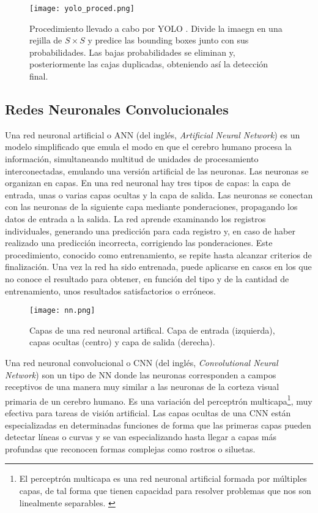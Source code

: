 \begin{figure}[H]
	\begin{center} 
		\texttt{[image: yolo\_proced.png]}
	\end{center}
	\caption{Procedimiento llevado a cabo por YOLO \cite{yolo}. Divide la imaegn en una rejilla de $S \times S$ y predice las bounding boxes junto con sus probabilidades. Las bajas probabilidades se eliminan y, posteriormente las cajas duplicadas, obteniendo así la detección final.}
	\label{fig:proced}
\end{figure}


\subsection{Redes Neuronales Convolucionales}

Una red neuronal artificial o ANN (del inglés, \textit{Artificial Neural Network}) es un modelo simplificado que emula el modo en que el cerebro humano procesa la información, simultaneando multitud de unidades de procesamiento interconectadas, emulando una versión artificial de las neuronas. Las neuronas se organizan en capas. En una red neuronal hay tres tipos de capas: la capa de entrada, unas o varias capas ocultas y la capa de salida. Las neuronas se conectan con las neuronas de la siguiente capa mediante ponderaciones, propagando los datos de entrada a la salida. La red aprende examinando los registros individuales, generando una predicción para cada registro y, en caso de haber realizado una predicción incorrecta, corrigiendo las ponderaciones. Este procedimiento, conocido como entrenamiento, se repite hasta alcanzar criterios de finalización.  Una vez la red ha sido entrenada, puede aplicarse en casos en los que no conoce el resultado para obtener, en función del tipo y de la cantidad de entrenamiento, unos resultados satisfactorios o erróneos. \cite{nn}\\

\begin{figure}[h]
	\begin{center} 
		\texttt{[image: nn.png]}
	\end{center}
	\caption{Capas de una red neuronal artifical. Capa de entrada (izquierda), capas ocultas (centro) y capa de salida (derecha). \cite{foto_nn}}
	\label{fig:nn}
\end{figure}

Una red neuronal convolucional o CNN (del inglés, \textit{Convolutional Neural Network}) son un tipo de NN donde las neuronas corresponden a campos receptivos de una manera muy similar a las neuronas de la corteza visual primaria de un cerebro humano. Es una variación del perceptrón multicapa\footnote{El perceptrón multicapa es una red neuronal artificial formada por múltiples capas, de tal forma que tienen capacidad para resolver problemas que nos son linealmente separables. \cite{perceptron}}, muy efectiva para tareas de visión artificial. Las capas ocultas de una CNN están especializadas en determinadas funciones de forma que las primeras capas pueden detectar líneas o curvas y se van especializando hasta llegar a capas más profundas que reconocen formas complejas como rostros o siluetas. \cite{cnn} \\

